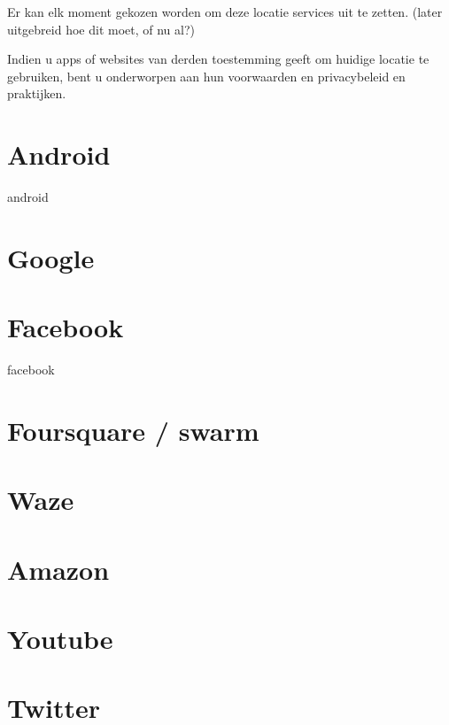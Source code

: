 Er kan elk moment gekozen worden om deze locatie services uit te zetten. (later uitgebreid hoe dit moet, of nu al?)

\iffalse
settings - privacy- location services
ofwel volledig ofwel elk individueel
\fi

Indien u apps of websites van derden toestemming geeft om huidige locatie te gebruiken, bent u onderworpen aan  hun voorwaarden en privacybeleid en praktijken.

\section{Android}
android

\section{Google}


\section{Facebook}
facebook

\section{Foursquare / swarm}


\section{Waze}

\section{Amazon}

\section{Youtube}

\section{Twitter}


